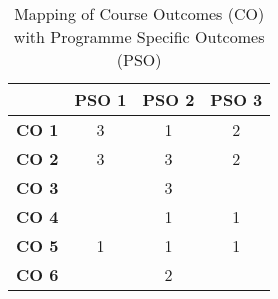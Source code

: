 \begin{table}[htp]
    \centering
    \caption*{Mapping of Course Outcomes (CO) with Programme Specific Outcomes (PSO)}
    \begin{tabular}{|c|c|c|c|}
        \hline
        \textbf{}     & \textbf{PSO 1} & \textbf{PSO 2} & \textbf{PSO 3} \\ \hline
        \textbf{CO 1} & 3              & 1              & 2              \\ \hline
        \textbf{CO 2} & 3              & 3              & 2              \\ \hline
        \textbf{CO 3} &                & 3              &                \\ \hline
        \textbf{CO 4} &                & 1              & 1              \\ \hline
        \textbf{CO 5} & 1              & 1              & 1              \\ \hline
        \textbf{CO 6} &                & 2              &                \\ \hline
    \end{tabular}
\end{table}